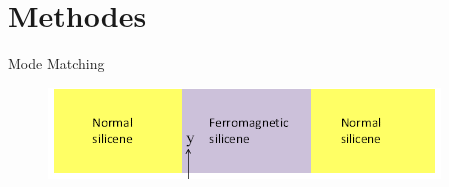 \documentclass[handout,t]{beamer}
\begin{document}
\section{Methodes}
\begin{frame}{Mode Matching}
	\begin{figure}
		\centering
		\includegraphics[width=\linewidth]{../figures/vallyschmatic.png}
		\label{fig:vallyschmatic}
	\end{figure}
\end{frame}
\end{document}
